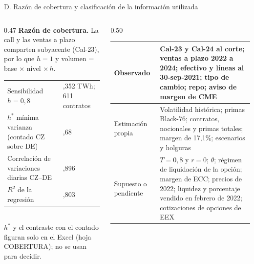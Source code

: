\documentclass[aspectratio=169,11pt]{beamer}
\newcommand{\fuente}[1]{\vfill{\raggedright\tiny\color{cezgray}Fuente: #1\par}}
\begin{document}
\begin{frame}[t]{D. Razón de cobertura y clasificación de la información utilizada}
  \begin{columns}[T]
    \begin{column}{0.47\textwidth}
      \scriptsize
      \textbf{Razón de cobertura.} La call y las ventas a plazo comparten subyacente (Cal-23), por lo que $h=1$ y volumen = base $\times$ nivel $\times\,h$.\\[2mm]
      \renewcommand{\arraystretch}{1.12}
      \begin{tabular}{@{}>{\raggedright}p{3.6cm}>{\raggedright\arraybackslash}p{2.3cm}@{}}
        \toprule
        Sensibilidad $h=0{,}8$ & 5,352 TWh; 611 contratos\\
        $h^{*}$ mínima varianza (contado CZ sobre DE) & 0,68\\
        Correlación de variaciones diarias CZ--DE & 0,896\\
        $R^2$ de la regresión & 0,803\\ \bottomrule
      \end{tabular}\\[1mm]
      {\tiny $h^{*}$ y el contraste con el contado figuran solo en el Excel (hoja COBERTURA); no se usan para decidir.}
    \end{column}
    \begin{column}{0.50\textwidth}
      \tiny
      \renewcommand{\arraystretch}{1.12}
      \begin{tabular}{@{}>{\bfseries\raggedright}p{1.9cm}>{\raggedright\arraybackslash}p{4.7cm}@{}}
        \toprule
        Observado & Cal-23 y Cal-24 al corte; ventas a plazo 2022 a 2024; efectivo y líneas al 30-sep-2021; tipo de cambio; repo; aviso de margen de CME\\ \midrule
        Estimación propia & Volatilidad histórica; primas Black-76; contratos, nocionales y primas totales; margen de 17,1\%; escenarios y holguras\\ \midrule
        Supuesto o pendiente & $T=0{,}8$ y $r=0$; $\theta$; régimen de liquidación de la opción; margen de ECC; precios de 2022; liquidez y porcentaje vendido en febrero de 2022; cotizaciones de opciones de EEX\\
        \bottomrule
      \end{tabular}
    \end{column}
  \end{columns}
\end{frame}
\end{document}
